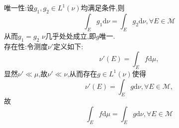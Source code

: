 \documentclass[]{article}
\title{}
\author{}
\begin{document}
\section{}
\noindent 唯一性:设$g_1,g_2\in L^1(\nu)$均满足条件,则$$\int_{E}g_1\mathrm{d}\nu=\int_{E}g_2\mathrm{d}\nu,\forall E\in \mathcal{M}$$ 从而$g_1=g_2$ $\nu$几乎处处成立,即$g$唯一.\\
存在性:令测度$\nu'$定义如下:$$\nu'(E)=\int_{E}f\mathrm{d}\mu,$$显然$\nu'\ll \mu$,故$\nu'\ll \nu$,从而存在$g\in L^1(\nu)$使得$$\nu'(E)=\int_{E}g\mathrm{d}\nu,\forall E\in \mathcal{M},$$故$$\int_{E}f\mathrm{d}\mu=\int_{E}g\mathrm{d}\nu,\forall E\in \mathcal{M}$$
$$
\end{document}
